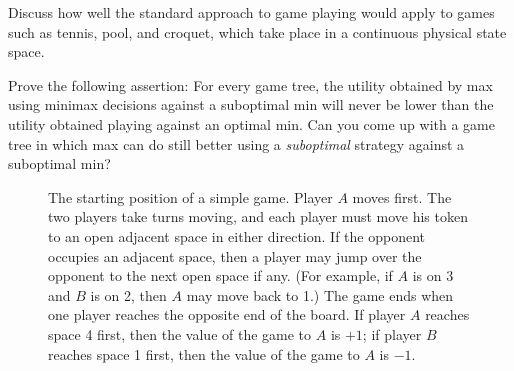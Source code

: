 \begin{exercise}
Discuss how well the standard approach to game playing would apply to
games such as tennis, pool, and croquet, which take place in a continuous
physical state space. 
\end{exercise} 



\begin{exercise}
Prove the following assertion: For every game tree, the utility
obtained by {\sc max} using minimax decisions against a suboptimal
{\sc min} will never be lower than the utility obtained playing
against an optimal {\sc min}. Can you come up with a game tree in which
{\sc max} can do still better using a {\em suboptimal} strategy
against a suboptimal {\sc min}?
\end{exercise} 

\begin{figure}[htbp]%
{}
\caption{The starting position of a simple game.
Player \(A\) moves first. The two players take turns moving, and each
player must move his token to an open adjacent space in either
direction.  If the opponent occupies an adjacent space, then a player
may jump over the opponent to the next open space if any. (For
example, if \(A\) is on 3 and \(B\) is on 2, then \(A\) may move back to 1.)
The game ends when one player reaches the opposite end of the board.
If player \(A\) reaches space 4 first, then the value of the game to \(A\)
is \(+1\); if player \(B\) reaches space 1 first, then the value of the
game to \(A\) is \(-1\).}
\label{line-game4-figure}
\end{figure} 

